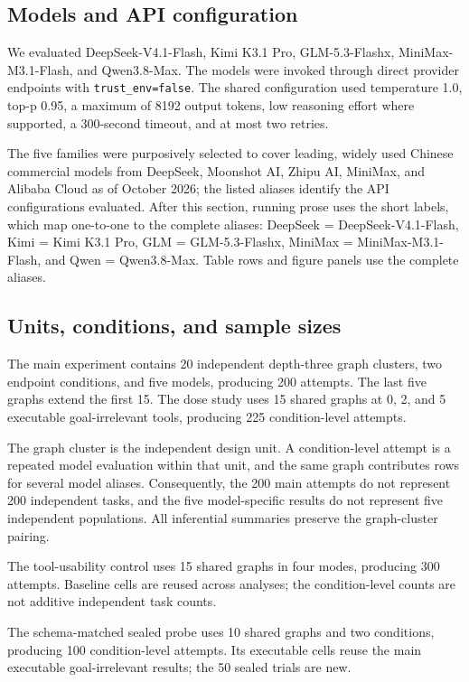 \documentclass[pdflatex,sn-basic]{sn-jnl}
\begin{document}


\subsection{Models and API configuration}

We evaluated DeepSeek-V4.1-Flash, Kimi K3.1 Pro, GLM-5.3-Flashx,
MiniMax-M3.1-Flash, and Qwen3.8-Max. The models were invoked through
direct provider endpoints with \texttt{trust\_env=false}. The shared
configuration used temperature 1.0, top-p 0.95, a maximum of 8192 output tokens,
low reasoning effort where supported, a 300-second timeout, and at most two
retries.

The five families were purposively selected to cover leading, widely used
Chinese commercial models from DeepSeek, Moonshot AI, Zhipu AI, MiniMax, and
Alibaba Cloud as of October 2026; the listed aliases identify the API
configurations evaluated. After this section, running prose uses the short
labels, which map one-to-one to the complete aliases: DeepSeek =
DeepSeek-V4.1-Flash, Kimi = Kimi K3.1 Pro, GLM = GLM-5.3-Flashx,
MiniMax = MiniMax-M3.1-Flash, and Qwen = Qwen3.8-Max. Table rows and figure
panels use the complete aliases.

\subsection{Units, conditions, and sample sizes}

The main experiment contains 20 independent depth-three graph clusters, two
endpoint conditions, and five models, producing 200 attempts. The last five
graphs extend the first 15. The dose study uses 15 shared graphs at 0, 2, and 5
executable goal-irrelevant tools, producing 225 condition-level attempts.

The graph cluster is the independent design unit. A condition-level attempt is a
repeated model evaluation within that unit, and the same graph contributes rows
for several model aliases. Consequently, the 200 main attempts do not represent
200 independent tasks, and the five model-specific results do not represent five
independent populations. All inferential summaries preserve the graph-cluster
pairing.

The tool-usability control uses 15 shared graphs in four modes, producing 300
attempts. Baseline cells are reused across analyses; the condition-level counts
are not additive independent task counts.

The schema-matched sealed probe uses 10 shared graphs and two conditions,
producing 100 condition-level attempts. Its executable cells reuse the main
executable goal-irrelevant results; the 50 sealed trials are new.
\end{document}
